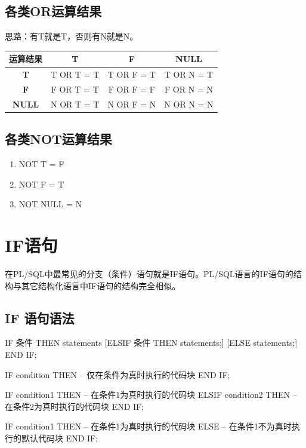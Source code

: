 \documentclass[11pt, a4paper, oneside, UTF8]{ctexbook}
\begin{document}
\subsection{各类OR运算结果}
思路：有T就是T，否则有N就是N。
\begin{center}
  \begin{minipage}{\textwidth}
    \centering
    \begin{tabular}{|c|c|c|c|} 
      \hline %
      \textbf{运算结果}   &   \textbf{T}  &   \textbf{F}  &   \textbf{NULL} \\
      \hline
      \textbf{T}          &   T OR T = T & T OR F = T  &  T OR N = T \\
      \hline
      \textbf{F}          &   F OR T = T & F OR F = F  &  F OR N = N \\
      \hline
      \textbf{NULL}       &   N OR T = T & N OR F = N  &  N OR N = N \\
      \hline
    \end{tabular}
    \captionsetup{hypcap=false}
    \label{tab:各类OR运算结果表} %
  \end{minipage}
\end{center}
\subsection{各类NOT运算结果}
\begin{enumerate}
  \item NOT T = F
  \item NOT F = T
  \item NOT NULL = N
\end{enumerate}
\section{IF语句}
在PL/SQL中最常见的分支（条件）语句就是IF语句。PL/SQL语言的IF语句的结构与其它结构化语言中IF语句的结构完全相似。

\subsection{IF 语句语法}
\begin{plsql}[caption=IF语法]
IF 条件 THEN
  statements
[ELSIF 条件 THEN
  statements;]
[ELSE
  statements;]
END IF;
\end{plsql}

\begin{plsql}[caption=IF语法示例1]
IF condition THEN
  -- 仅在条件为真时执行的代码块
END IF;

IF condition1 THEN
  -- 在条件1为真时执行的代码块
ELSIF condition2 THEN
  -- 在条件2为真时执行的代码块
END IF;

IF condition1 THEN
  -- 在条件1为真时执行的代码块
ELSE
  -- 在条件1不为真时执行的默认代码块
END IF;
\end{plsql}
\end{document}
